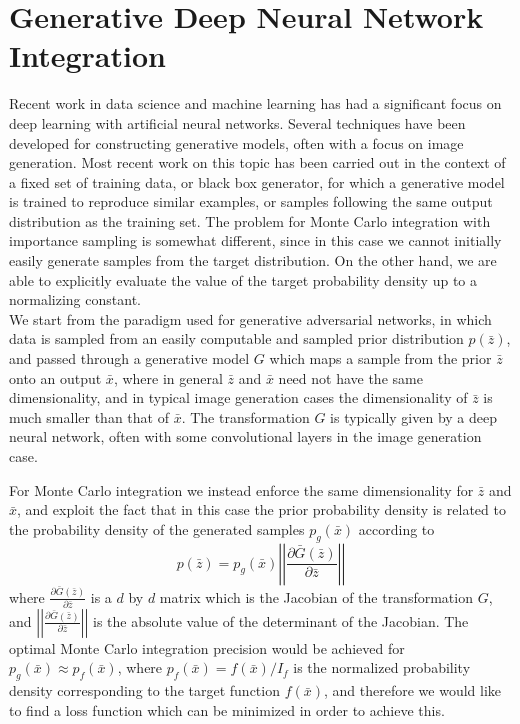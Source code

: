\documentclass[a4paper,11pt]{article}
\begin{document}
\section{Generative Deep Neural Network Integration}
Recent work in data science and machine learning has had a significant focus on deep learning with artificial neural networks.  Several techniques have been developed for constructing generative models\cite{gan,vae,autoregressive}, often with a focus on image generation.  Most recent work on this topic has been carried out in the context of a fixed set of training data, or black box generator, for which a generative model is trained to reproduce similar examples, or samples following the same output distribution as the training set.  The problem for Monte Carlo integration with importance sampling is somewhat different, since in this case we cannot initially easily generate samples from the target distribution.  On the other hand, we are able to explicitly evaluate the value of the target probability density up to a normalizing constant.\\

We start from the paradigm used for generative adversarial networks\cite{gan}, in which data is sampled from an easily computable and sampled prior distribution $p(\bar z)$, and passed through a generative model $G$ which maps a sample from the prior $\bar z$ onto an output $\bar x$, where in general $\bar z$ and $\bar x$ need not have the same dimensionality, and in typical image generation cases the dimensionality of $\bar z$ is much smaller than that of $\bar x$.  The transformation $G$ is typically given by a deep neural network, often with some convolutional layers in the image generation case.

For Monte Carlo integration we instead enforce the same dimensionality for $\bar z$ and $\bar x$, and exploit the fact that in this case the prior probability density is related to the probability density of the generated samples $p_g(\bar x)$ according to
\begin{equation}
 p(\bar z) = p_g(\bar x)\left|\left|\frac{\partial \bar G(\bar z)}{\partial\bar z}\right|\right|
 \label{eqn:pg}
\end{equation}
where $\frac{\partial \bar G(\bar z)}{\partial\bar z}$ is a $d$ by $d$ matrix which is the Jacobian of the transformation $G$, and $\left|\left|\frac{\partial \bar G(\bar z)}{\partial\bar z}\right|\right|$ is the absolute value of the determinant of the Jacobian.  The optimal Monte Carlo integration precision would be achieved for $p_g(\bar x) \approx p_f(\bar x)$, where $p_f(\bar x) = f(\bar x)/I_f$ is the normalized probability density corresponding to the target function $f(\bar x)$, and therefore we would like to find a loss function which can be minimized in order to achieve this.\\
\end{document}
